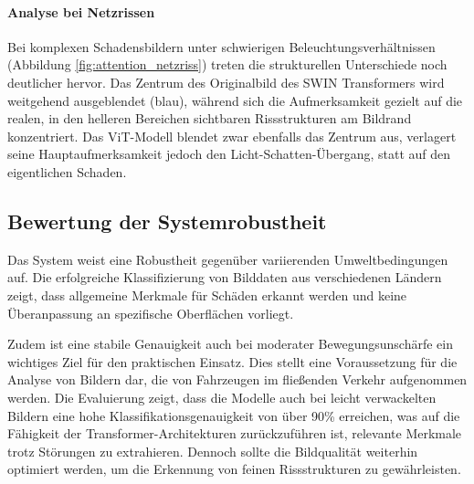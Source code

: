 \paragraph{Analyse bei Netzrissen}
Bei komplexen Schadensbildern unter schwierigen Beleuchtungsverhältnissen (Abbildung \ref{fig:attention_netzriss}) treten die strukturellen Unterschiede noch deutlicher hervor. Das Zentrum des Originalbild des SWIN Transformers wird weitgehend ausgeblendet (blau), während sich die Aufmerksamkeit gezielt auf die realen, in den helleren Bereichen sichtbaren Rissstrukturen am Bildrand konzentriert. Das ViT-Modell blendet zwar ebenfalls das Zentrum aus, verlagert seine Hauptaufmerksamkeit jedoch den Licht-Schatten-Übergang, statt auf den eigentlichen Schaden.
\subsection{Bewertung der Systemrobustheit}
\label{subsec:robustheit}

Das System weist eine Robustheit gegenüber variierenden Umweltbedingungen auf. Die erfolgreiche Klassifizierung von Bilddaten aus verschiedenen Ländern zeigt, dass allgemeine Merkmale für Schäden erkannt werden und keine Überanpassung an spezifische Oberflächen vorliegt.

Zudem ist eine stabile Genauigkeit auch bei moderater Bewegungsunschärfe ein wichtiges Ziel für den praktischen Einsatz. Dies stellt eine Voraussetzung für die Analyse von Bildern dar, die von Fahrzeugen im fließenden Verkehr aufgenommen werden. Die Evaluierung zeigt, dass die Modelle auch bei leicht verwackelten Bildern eine hohe Klassifikationsgenauigkeit von über 90\% erreichen, was auf die Fähigkeit der Transformer-Architekturen zurückzuführen ist, relevante Merkmale trotz Störungen zu extrahieren. Dennoch sollte die Bildqualität weiterhin optimiert werden, um die Erkennung von feinen Rissstrukturen zu gewährleisten.
